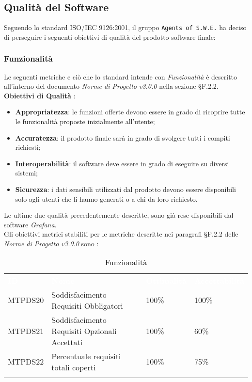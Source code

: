 \subsection{Qualità del Software}
\label{qs}
Seguendo lo standard ISO/IEC 9126:2001, il gruppo \texttt{Agents of S.W.E.} ha deciso di perseguire i seguenti obiettivi di qualità del prodotto software finale:

\subsubsection{Funzionalità}
\label{func}
Le seguenti metriche e ciò che lo standard intende con \textit{Funzionalità} è descritto all'interno del documento \textit{Norme di Progetto v3.0.0} nella sezione §F.2.2.\\

\textbf{Obiettivi di Qualità} :
\begin{itemize}
	\item \textbf{Appropriatezza}: le funzioni offerte devono essere in grado di ricoprire tutte le funzionalità proposte inizialmente all'utente;
	\item \textbf{Accuratezza}: il prodotto finale sarà in grado di svolgere tutti i compiti richiesti;
	\item \textbf{Interoperabilità}: il software deve essere in grado di eseguire su diversi sistemi;
	\item \textbf{Sicurezza}: i dati sensibili utilizzati dal prodotto devono essere disponibili solo agli utenti che li hanno generati o a chi da loro richiesto. 
\end{itemize}
Le ultime due qualità precedentemente descritte, sono già rese disponibili dal software \textit{Grafana}. \\
Gli obiettivi metrici stabiliti per le metriche descritte nei paragrafi §F.2.2 delle \textit{Norme di Progetto v3.0.0} sono : 

\begin{longtable}{|C{.15\textwidth}|C{.24\textwidth}|C{.24\textwidth}|C{.24\textwidth}|}
\hline
{}\textbf{\textcolor{white}{ID}} & \textbf{\textcolor{white}{Nome}} & \textbf{\textcolor{white}{Ottimalità}} & \textbf{\textcolor{white}{Accettabilità}}\\
MTPDS20 & Soddisfacimento Requisiti Obbligatori & 100\% & 100\%\\
\hline
{}MTPDS21 & Soddisfacimento Requisiti Opzionali Accettati & 100\% & 60\% \\
\hline
MTPDS22 & Percentuale requisiti totali coperti & 100\% & 75\% \\ 
\hline
\caption{Funzionalità}
\label{Funzionalità}
\end{longtable}

